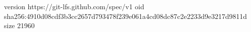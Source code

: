 version https://git-lfs.github.com/spec/v1
oid sha256:4910d08cdf3b3cc2657d793478f239e061a4cd08dc87c2e2233d9e3217d9811d
size 21960
